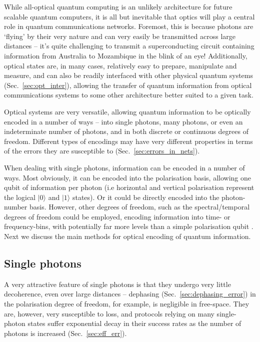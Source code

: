 \documentclass[aps, rmp, twocolumn, amsmath, amssymb, nofootinbib, superscriptaddress, longbibliography, floatfix, table-of-contents, eqsecnum]{revtex4-1}
\newcommand{\ket}[1]{|#1\rangle}
\begin{document}
While all-optical quantum computing is an unlikely architecture for future scalable quantum computers, it is all but inevitable that optics will play a central role in quantum communications networks. Foremost, this is because photons are `flying' by their very nature and can very easily be transmitted across large distances -- it's quite challenging to transmit a superconducting circuit containing information from Australia to Mozambique in the blink of an eye! Additionally, optical states are, in many cases, relatively easy to prepare, manipulate and measure, and can also be readily interfaced with other physical quantum systems (Sec.~\ref{sec:opt_inter}), allowing the transfer of quantum information from optical communications systems to some other architecture better suited to a given task.

Optical systems are very versatile, allowing quantum information to be optically encoded in a number of ways -- into single photons, many photons, or even an indeterminate number of photons, and in both discrete or continuous degrees of freedom. Different types of encodings may have very different properties in terms of the errors they are susceptible to (Sec.~\ref{sec:errors_in_nets}).

When dealing with single photons, information can be encoded in a number of ways. Most obviously, it can be encoded into the polarisation basis, allowing one qubit of information per photon (i.e horizontal and vertical polarisation represent the logical $\ket{0}$ and $\ket{1}$ states). Or it could be directly encoded into the photon-number basis. However, other degrees of freedom, such as the spectral/temporal degrees of freedom could be employed, encoding information into time- or frequency-bins, with potentially far more levels than a simple polarisation qubit \cite{bib:RohdeInfCap13}. Next we discuss the main methods for optical encoding of quantum information.

%
%

\subsection{Single photons} \label{sec:single_phot_enc} 

A very attractive feature of single photons is that they undergo very little decoherence, even over large distances -- dephasing (Sec.~\ref{sec:dephasing_error}) in the polarisation degree of freedom, for example, is negligible in free-space. They are, however, very susceptible to loss, and protocols relying on many single-photon states suffer exponential decay in their success rates as the number of photons is increased (Sec.~\ref{sec:eff_err}).
\end{document}
